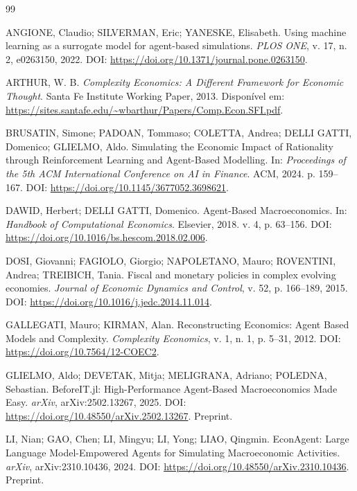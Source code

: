 \documentclass[12pt,a4paper]{article}
\begin{document}
\renewcommand{\refname}{Referências bibliográficas}
\begin{thebibliography}{99}

 ANGIONE, Claudio; SILVERMAN, Eric; YANESKE, Elisabeth. Using machine learning as a surrogate model for agent-based simulations. \emph{PLOS ONE}, v. 17, n. 2, e0263150, 2022. DOI: \url{https://doi.org/10.1371/journal.pone.0263150}.

 ARTHUR, W. B. \emph{Complexity Economics: A Different Framework for Economic Thought}. Santa Fe Institute Working Paper, 2013. Disponível em: \url{https://sites.santafe.edu/~wbarthur/Papers/Comp.Econ.SFI.pdf}.

 BRUSATIN, Simone; PADOAN, Tommaso; COLETTA, Andrea; DELLI GATTI, Domenico; GLIELMO, Aldo. Simulating the Economic Impact of Rationality through Reinforcement Learning and Agent-Based Modelling. In: \emph{Proceedings of the 5th ACM International Conference on AI in Finance}. ACM, 2024. p. 159--167. DOI: \url{https://doi.org/10.1145/3677052.3698621}.

 DAWID, Herbert; DELLI GATTI, Domenico. Agent-Based Macroeconomics. In: \emph{Handbook of Computational Economics}. Elsevier, 2018. v. 4, p. 63--156. DOI: \url{https://doi.org/10.1016/bs.hescom.2018.02.006}.

 DOSI, Giovanni; FAGIOLO, Giorgio; NAPOLETANO, Mauro; ROVENTINI, Andrea; TREIBICH, Tania. Fiscal and monetary policies in complex evolving economies. \emph{Journal of Economic Dynamics and Control}, v. 52, p. 166--189, 2015. DOI: \url{https://doi.org/10.1016/j.jedc.2014.11.014}.

 GALLEGATI, Mauro; KIRMAN, Alan. Reconstructing Economics: Agent Based Models and Complexity. \emph{Complexity Economics}, v. 1, n. 1, p. 5--31, 2012. DOI: \url{https://doi.org/10.7564/12-COEC2}.

 GLIELMO, Aldo; DEVETAK, Mitja; MELIGRANA, Adriano; POLEDNA, Sebastian. BeforeIT.jl: High-Performance Agent-Based Macroeconomics Made Easy. \emph{arXiv}, arXiv:2502.13267, 2025. DOI: \url{https://doi.org/10.48550/arXiv.2502.13267}. Preprint.

 LI, Nian; GAO, Chen; LI, Mingyu; LI, Yong; LIAO, Qingmin. EconAgent: Large Language Model-Empowered Agents for Simulating Macroeconomic Activities. \emph{arXiv}, arXiv:2310.10436, 2024. DOI: \url{https://doi.org/10.48550/arXiv.2310.10436}. Preprint.


\end{thebibliography}
\end{document}
